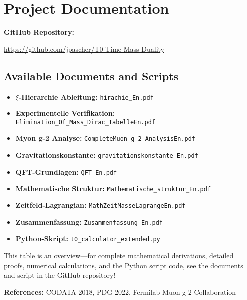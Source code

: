 \documentclass[12pt,a4paper]{article}
\begin{document}
	\section{Project Documentation}
	\textbf{GitHub Repository:}
	\begin{center}
		\url{https://github.com/jpascher/T0-Time-Mass-Duality}
	\end{center}
	
	\subsection{Available Documents and Scripts}
	\begin{itemize}
	\item \textbf{$\xi$-Hierarchie Ableitung:} \texttt{hirachie\_En.pdf}
	\item \textbf{Experimentelle Verifikation:} \texttt{Elimination\_Of\_Mass\_Dirac\_TabelleEn.pdf}
	\item \textbf{Myon g-2 Analyse:} \texttt{CompleteMuon\_g-2\_AnalysisEn.pdf}
	\item \textbf{Gravitationskonstante:} \texttt{gravitationskonstante\_En.pdf}
	\item \textbf{QFT-Grundlagen:} \texttt{QFT\_En.pdf}
	\item \textbf{Mathematische Struktur:} \texttt{Mathematische\_struktur\_En.pdf}
	\item \textbf{Zeitfeld-Lagrangian:} \texttt{MathZeitMasseLagrangeEn.pdf}
	\item \textbf{Zusammenfassung:} \texttt{Zusammenfassung\_En.pdf}
	\item \textbf{Python-Skript:} \texttt{t0\_calculator\_extended.py}
\end{itemize}
	
	This table is an overview—for complete mathematical derivations, detailed proofs, numerical calculations, and the Python script code, see the documents and script in the GitHub repository!
	
	\textbf{References:} CODATA 2018, PDG 2022, Fermilab Muon g-2 Collaboration
	
\end{document}
